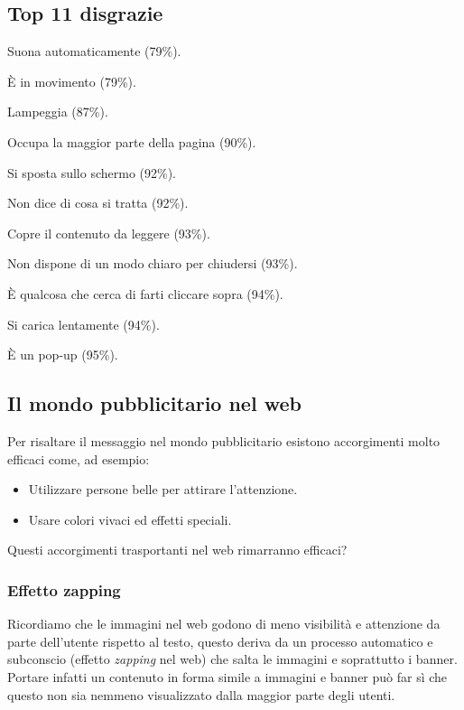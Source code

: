 		\subsection{Top 11 disgrazie}
			\begin{etaremune}
				\item Suona automaticamente (79\%).
				\item È in movimento (79\%).
				\item Lampeggia (87\%).
				\item Occupa la maggior parte della pagina (90\%).
				\item Si sposta sullo schermo (92\%).
				\item Non dice di cosa si tratta (92\%).
				\item Copre il contenuto da leggere (93\%).
				\item Non dispone di un modo chiaro per chiudersi (93\%).
				\item È qualcosa che cerca di farti cliccare sopra (94\%).
				\item Si carica lentamente (94\%).
				\item È un pop-up (95\%).
			\end{etaremune}
		
		\subsection{Il mondo pubblicitario nel web}
			Per risaltare il messaggio nel mondo pubblicitario esistono accorgimenti molto efficaci come, ad esempio:
			\begin{itemize}
				\item Utilizzare persone belle per attirare l'attenzione.
				\item Usare colori vivaci ed effetti speciali.
			\end{itemize}
			Questi accorgimenti trasportanti nel web rimarranno efficaci?
		
			\subsubsection{Effetto zapping}
				Ricordiamo che le immagini nel web godono di meno visibilità e attenzione da parte dell'utente rispetto al testo, questo deriva da un processo automatico e subconscio (effetto \emph{zapping} nel web) che salta le immagini e soprattutto i banner. Portare infatti un contenuto in forma simile a immagini e banner può far sì che questo non sia nemmeno visualizzato dalla maggior parte degli utenti. 
				
